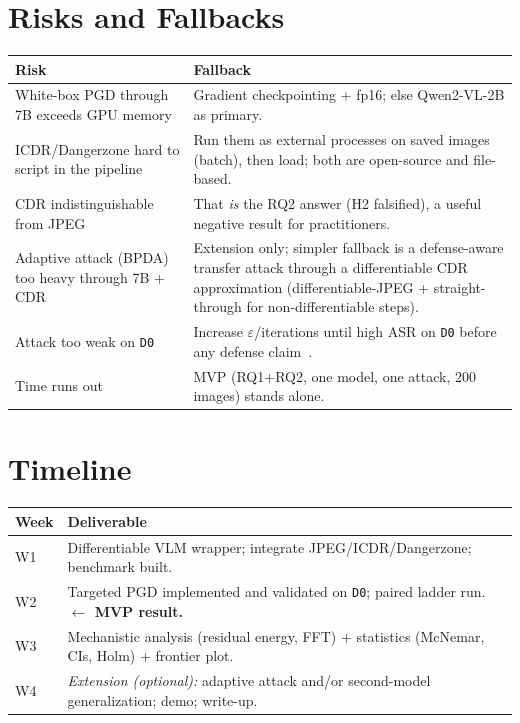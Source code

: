 \documentclass[11pt]{article}
\begin{document}
\section{Risks and Fallbacks}
\begin{tabularx}{\textwidth}{@{}Y Y@{}}
\toprule
\textbf{Risk} & \textbf{Fallback} \\
\midrule
White-box PGD through 7B exceeds GPU memory &
  Gradient checkpointing + fp16; else Qwen2-VL-2B as primary. \\
ICDR/Dangerzone hard to script in the pipeline &
  Run them as external processes on saved images (batch), then load; both are
  open-source and file-based. \\
CDR indistinguishable from JPEG &
  That \emph{is} the RQ2 answer (H2 falsified), a useful negative result for
  practitioners. \\
Adaptive attack (BPDA) too heavy through 7B $+$ CDR &
  Extension only; simpler fallback is a defense-aware transfer attack through a
  differentiable CDR approximation (differentiable-JPEG + straight-through for
  non-differentiable steps). \\
Attack too weak on \texttt{D0} &
  Increase $\varepsilon$/iterations until high ASR on \texttt{D0} before any
  defense claim~\cite{carlini2019evaluating}. \\
Time runs out &
  MVP (RQ1+RQ2, one model, one attack, 200 images) stands alone. \\
\bottomrule
\end{tabularx}

\section{Timeline}
\begin{tabularx}{\textwidth}{@{}l Y@{}}
\toprule
\textbf{Week} & \textbf{Deliverable} \\
\midrule
W1 & Differentiable VLM wrapper; integrate JPEG/ICDR/Dangerzone; benchmark built. \\
W2 & Targeted PGD implemented and validated on \texttt{D0}; paired ladder run. \textbf{$\leftarrow$ MVP result.} \\
W3 & Mechanistic analysis (residual energy, FFT) + statistics (McNemar, CIs, Holm) + frontier plot. \\
W4 & \emph{Extension (optional):} adaptive attack and/or second-model generalization; demo; write-up. \\
\bottomrule
\end{tabularx}
\end{document}
